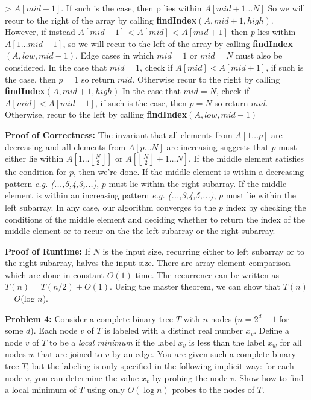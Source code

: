 \documentclass[11pt]{article}
\begin{document}
\begin{flushleft}
		\textgreater{ $A[mid + 1]$}. If such is the case, then p lies within $A[mid + 1 \dots N]$ So we will recur to the right of the array by calling \textbf{findIndex}$(A, mid + 1, high)$.
		However, if instead $A[mid - 1]$ \textless{ $A[mid]$} \textless { $A[mid + 1]$} then \emph{p} lies within $A[1 \dots mid - 1]$, so we will recur to the left of the array by calling
		\textbf{findIndex$(A, low, mid -1)$}.\newpage
		Edge cases in which $mid = 1$ or $mid = N$ must also be considered.\newline
		In the case that $mid = 1$, check if $A[mid] < A[mid + 1]$, if such is the case, then $p = 1$ so return $mid$. Otherwise recur to the right by calling \textbf{findIndex}$(A, mid + 1, high)$\newline
		In the case that $mid = N$, check if $A[mid] < A[mid - 1]$, if such is the case, then $p = N$ so return $mid$. Otherwise, recur to the left by calling \textbf{findIndex}$(A, low, mid - 1)$\newline
		  
		\textbf{Proof of Correctness:} The invariant that all elements from $A[1 \dots p]$ are decreasing and all elements from $A[p \dots N]$ are increasing suggests that $p$ must either lie within $A[1 \dots \left\lfloor\frac{N}{2}\right\rfloor]$ or 
		$A[\left\lfloor\frac{N}{2}\right\rfloor + 1 \dots N]$. \newline
		If the middle element satisfies the condition for $p$, then we're done.
		If the middle element is within a decreasing pattern \emph{e.g. (...,5,4,3,...)}, $p$ must lie within the right subarray.  
		If the middle element is within an increasing pattern \emph{e.g. (...,3,4,5,...)}, $p$ must lie within the left subarray.
		In any case, our algorithm converges to the $p$ index by checking the conditions of the middle element and deciding whether to return the index of the middle element or to recur on the the left subarray or the right subarray. \newline
		\vspace{0.2cm}
		
		\textbf{Proof of Runtime:} If $N$ is the input size, recurring either to left subarray or to the right subarray, halves the input size. There are array element comparison which are done in constant $O(1)$ time. The recurrence can be written as $T(n) = T(n / 2) + O(1)$. Using the master theorem, we can show that $T(n)$ = $O$(log $n$).
		\vspace{0.2cm}
		
		\item \textbf {\underline{Problem 4:}} Consider a complete binary tree $T$ with $n$ nodes ($n = 2^d-1$ for some $d$). Each node $v$ of $T$ is labeled with a distinct real number $x_v$. Define a node $v$ of $T$ to be a \textit{local minimum} if the label $x_v$ is less than the label $x_w$ for all nodes $w$ that are joined to $v$ by an edge. You are given such a complete binary tree $T$, but the labeling is only specified in the following implicit way: for each node $v$, you can determine the value $x_v$ by probing the node $v$. Show how to find a local minimum of $T$ using only $O(\log n)$ probes to the nodes of $T$.\newline
		

\end{flushleft}
\end{document}
